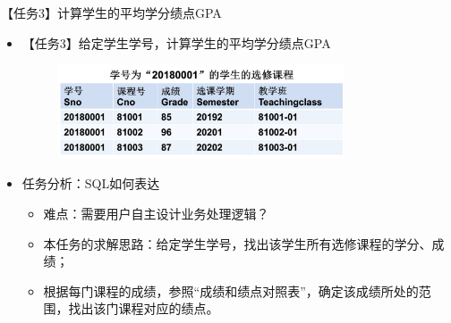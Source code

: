 \begin{frame}[allowframebreaks]{【任务3】计算学生的平均学分绩点GPA}
\begin{itemize}
    \item 【任务3】给定学生学号，计算学生的平均学分绩点GPA
\begin{figure}
    \centering
    \includegraphics[width=0.8\textwidth]{figure/fig-5.jpg}
\end{figure}

\framebreak
\item 任务分析：SQL如何表达
    \begin{itemize}
    \item 难点：需要用户自主设计业务处理逻辑？
    \item 本任务的求解思路：给定学生学号，找出该学生所有选修课程的学分、成绩；
    \item 根据每门课程的成绩，参照“成绩和绩点对照表”，确定该成绩所处的范围，找出该门课程对应的绩点。
    \end{itemize}
\end{itemize}

\end{frame}

